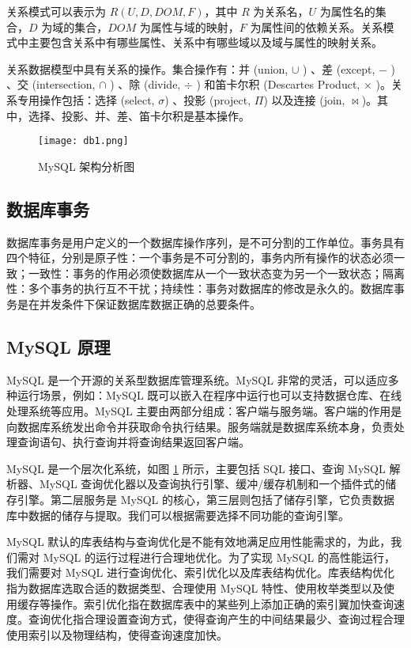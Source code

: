 关系模式可以表示为 $R(U, D, DOM, F)$，其中 $R$ 为关系名，$U$ 为属性名的集合，$D$ 为域的集合，$DOM$ 为属性与域的映射，$F$ 为属性间的依赖关系。关系模式中主要包含关系中有哪些属性、关系中有哪些域以及域与属性的映射关系。

关系数据模型中具有关系的操作。集合操作有：并 (union, $\cup$ ) 、差 (except, $-$ ) 、交 (intersection, $\cap$ ) 、除 (divide, $\div$ ) 和笛卡尔积 (Descartes Product, $\times$ )。关系专用操作包括：选择 (select, $\sigma$) 、投影 (project, $\Pi$) 以及连接 (join, $\Join $)。其中，选择、投影、并、差、笛卡尔积是基本操作\cite{ullman1984principles}。

\begin{figure}[!ht]
    \centering
    \texttt{[image: db1.png]}
    \caption{MySQL 架构分析图}
    \label{fig:db1}
\end{figure}


\subsection{数据库事务}

数据库事务是用户定义的一个数据库操作序列，是不可分割的工作单位。事务具有四个特征，分别是原子性：一个事务是不可分割的，事务内所有操作的状态必须一致；一致性：事务的作用必须使数据库从一个一致状态变为另一个一致状态；隔离性：多个事务的执行互不干扰；持续性：事务对数据库的修改是永久的。数据库事务是在并发条件下保证数据库数据正确的总要条件。

\subsection{MySQL 原理}
MySQL 是一个开源的关系型数据库管理系统。MySQL 非常的灵活，可以适应多种运行场景，例如：MySQL 既可以嵌入在程序中运行也可以支持数据仓库、在线处理系统等应用\cite{姜承尧2011mysql}。MySQL 主要由两部分组成：客户端与服务端。客户端的作用是向数据库系统发出命令并获取命令执行结果。服务端就是数据库系统本身，负责处理查询语句、执行查询并将查询结果返回客户端。

MySQL 是一个层次化系统，如图 \ref{fig:db1} 所示，主要包括 SQL 接口、查询 MySQL 解析器、MySQL 查询优化器以及查询执行引擎、缓冲/缓存机制和一个插件式的储存引擎。第二层服务是 MySQL 的核心，第三层则包括了储存引擎，它负责数据库中数据的储存与提取。我们可以根据需要选择不同功能的查询引擎\cite{schwartz2012high}。


MySQL 默认的库表结构与查询优化是不能有效地满足应用性能需求的，为此，我们需对 MySQL 的运行过程进行合理地优化。为了实现 MySQL 的高性能运行，我们需要对 MySQL 进行查询优化、索引优化以及库表结构优化。库表结构优化指为数据库选取合适的数据类型、合理使用 MySQL 特性、使用枚举类型以及使用缓存等操作。索引优化指在数据库表中的某些列上添加正确的索引翼加快查询速度。查询优化指合理设置查询方式，使得查询产生的中间结果最少、查询过程合理使用索引以及物理结构，使得查询速度加快。

